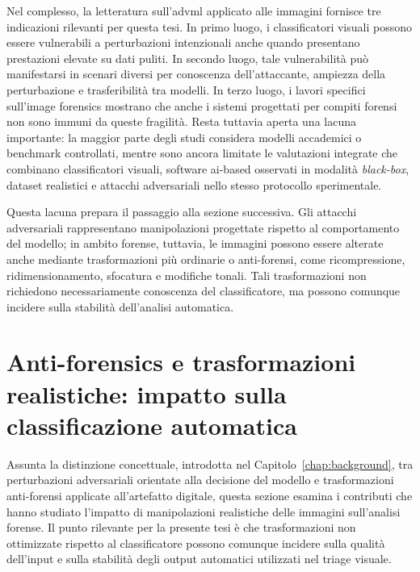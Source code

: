 Nel complesso, la letteratura sull'\gls{advml} applicato alle immagini fornisce
tre indicazioni rilevanti per questa tesi. In primo luogo, i classificatori
visuali possono essere vulnerabili a perturbazioni intenzionali anche quando
presentano prestazioni elevate su dati puliti. In secondo luogo, tale
vulnerabilità può manifestarsi in scenari diversi per conoscenza
dell'attaccante, ampiezza della perturbazione e trasferibilità tra modelli. In
terzo luogo, i lavori specifici sull'image forensics mostrano che anche i
sistemi progettati per compiti forensi non sono immuni da queste fragilità.
Resta tuttavia aperta una lacuna importante: la maggior parte degli studi
considera modelli accademici o benchmark controllati, mentre sono ancora
limitate le valutazioni integrate che combinano classificatori visuali, software
\gls{ai}-based osservati in modalità \textit{black-box}, dataset realistici e
attacchi adversariali nello stesso protocollo sperimentale.

Questa lacuna prepara il passaggio alla sezione successiva. Gli attacchi
adversariali rappresentano manipolazioni progettate rispetto al comportamento
del modello; in ambito forense, tuttavia, le immagini possono essere alterate
anche mediante trasformazioni più ordinarie o anti-forensi, come ricompressione,
ridimensionamento, sfocatura e modifiche tonali. Tali trasformazioni non
richiedono necessariamente conoscenza del classificatore, ma possono comunque
incidere sulla stabilità dell'analisi automatica.

\section{Anti-forensics e trasformazioni realistiche: impatto sulla classificazione automatica}
\label{sec:sota-antiforensics}

Assunta la distinzione concettuale, introdotta nel Capitolo~\ref{chap:background}, tra perturbazioni adversariali orientate alla decisione del modello e trasformazioni anti-forensi applicate all'artefatto digitale, questa sezione esamina i contributi che hanno studiato l'impatto di manipolazioni realistiche delle immagini sull'analisi forense. Il punto rilevante per la presente tesi è che trasformazioni non ottimizzate rispetto al classificatore possono comunque incidere sulla qualità dell'input e sulla stabilità degli output automatici utilizzati nel triage visuale.

